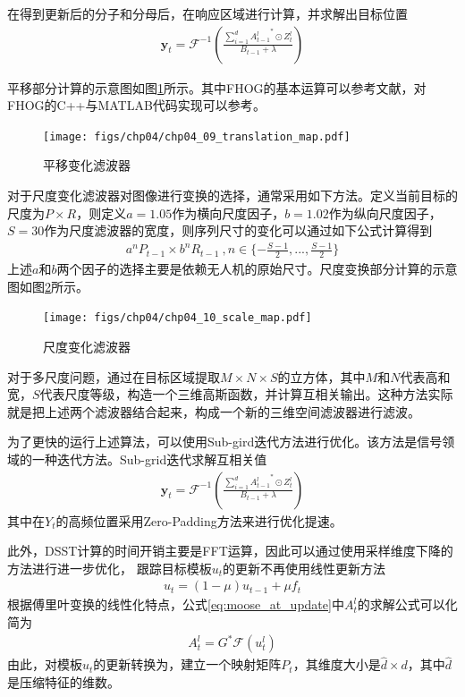 在得到更新后的分子和分母后，在响应区域进行计算，并求解出目标位置
\begin{align}
\mathbf{y}_t=\mathcal{F}^{-1}(\frac{\sum_{i=1}^{d}{A^{l}_{t-1}}^*\odot Z^{l}_{t}}{B_{t-1}+\lambda})
\end{align}

平移部分计算的示意图如图\ref{fig:chp04_09_translation_map}所示。其中FHOG的基本运算可以参考文献\cite{lsvm-pami}，对FHOG的C++与MATLAB代码实现可以参考\cite{voc-release5}。

\begin{figure}[ht]   
	\centering
	\texttt{[image: figs/chp04/chp04\_09\_translation\_map.pdf]}
	\caption{平移变化滤波器}
	\label{fig:chp04_09_translation_map}
\end{figure}

对于尺度变化滤波器对图像进行变换的选择，通常采用如下方法。定义当前目标的尺度为$P\times R$，则定义$a = 1.05$作为横向尺度因子，$b = 1.02$作为纵向尺度因子，$S=30$作为尺度滤波器的宽度，则序列尺寸的变化可以通过如下公式计算得到
\begin{align}
a^nP_{t-1}\times b^nR_{t-1}\ ,n \in \{-\frac{S-1}{2},...,\frac{S-1}{2}\} 
\end{align}
上述$a$和$b$两个因子的选择主要是依赖无人机的原始尺寸。尺度变换部分计算的示意图如图\ref{fig:chp04_10_scale_map}所示。
\begin{figure}[ht]   
	\centering
	\texttt{[image: figs/chp04/chp04\_10\_scale\_map.pdf]}
	\caption{尺度变化滤波器}
	\label{fig:chp04_10_scale_map}
\end{figure}
对于多尺度问题，通过在目标区域提取$M\times N \times S$的立方体，其中$M$和$N$代表高和宽，$S$代表尺度等级，构造一个三维高斯函数，并计算互相关输出。这种方法实际就是把上述两个滤波器结合起来，构成一个新的三维空间滤波器进行滤波。


为了更快的运行上述算法，可以使用Sub-gird迭代方法进行优化。该方法是信号领域的一种迭代方法\cite{oppenheim1996signals}。Sub-grid迭代求解互相关值
\begin{align}
\mathbf{y}_t=\mathcal{F}^{-1}(\frac{\sum_{i=1}^{d}{A^{l}_{t-1}}^*\odot Z^{l}_{t}}{B_{t-1}+\lambda})
\end{align}
其中在$Y_t$的高频位置采用Zero-Padding方法来进行优化提速。

此外，DSST计算的时间开销主要是FFT运算，因此可以通过使用采样维度下降的方法进行进一步优化， 跟踪目标模板$u_t$的更新不再使用线性更新方法
\begin{align}
u_t = (1-\mu)u_{t-1}+\mu f_t
\end{align}
根据傅里叶变换的线性化特点，公式\ref{eq:moose_at_update}中$A_t^l$的求解公式可以化简为
\begin{align}
A_t^l=G^* \mathcal{F}(u_t^l)
\end{align}
由此，对模板$u_t$的更新转换为，建立一个映射矩阵$P_t$，其维度大小是$\hat{d} \times d$，其中$\hat{d}$是压缩特征的维数。

